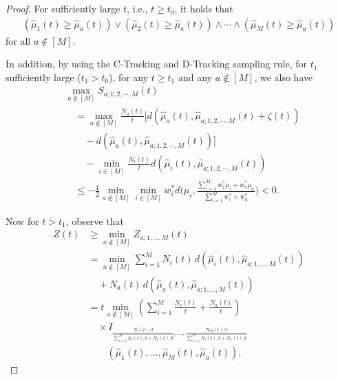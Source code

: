 \documentclass[10pt,a4paper]{amsart}
\newcommand{\nn}{\nonumber}
\begin{document}
\begin{proof}
For sufficiently large $ t$, i.e., $t \geq t_0$, it holds that
\begin{align}
(\hat{\mu}_1(t) \geq \hat{\mu}_a(t)) \vee (\hat{\mu}_2(t) \geq \hat{\mu}_a(t)) \wedge \cdots \wedge (\hat{\mu}_M(t) \geq \hat{\mu}_a(t))
\end{align}
for all $ a \notin [M]$.

In addition, by using the C-Tracking and D-Tracking sampling rule, for $t_1$ sufficiently large ($t_1>t_0$), for any $t\geq t_1$ and any $a \notin [M]$, we also have
\begin{align}
&\max_{a \notin [M]} S_{a;1,2,\cdots,M}(t) \nn \\
&\quad =\max_{a \notin [M]} \frac{N_a(t)}{t} \big[d(\hat{\mu}_a(t),\hat{\mu}_{a;1,2,\cdots,M}(t)+\zeta(t))\nn\\
&\qquad - d(\hat{\mu}_a(t),\hat{\mu}_{a;1,2,\cdots,M}(t))\big]\nn\\
&\qquad -\min_{i \in [M]} \frac{N_i(t)}{t} d(\hat{\mu}_i(t),\hat{\mu}_{a;1,2,\cdots,M}(t)) \nn \\
&\quad  \leq -\frac{1}{2}\min_{a \notin [M]} \min_{i \in [M]}  w_i^* d\bigg(\mu_i, \frac{\sum_{i=1}^M w_i^* \mu_i +w_a^* \mu_a}{\sum_{i=1}^M w_i^*+ w_a^*}\bigg)<0. 
\end{align}

Now for $t>t_1$, observe that
\begin{align}
Z(t) &\geq \min_{a \notin [M]} Z_{a;1,\ldots,M}(t) \nn \\
&= \min_{a \notin [M]} \sum_{i=1}^M N_i(t)\, d\left(\hat{\mu}_i(t), \hat{\mu}_{a;1,\ldots,M}(t)\right) \nn\\
&\quad + N_a(t)\, d\left(\hat{\mu}_a(t), \hat{\mu}_{a;1,\ldots,M}(t)\right) \nn \\
&= t  \min_{a \notin [M]} \left( \sum_{i=1}^M \frac{N_i(t)}{t} + \frac{N_a(t)}{t} \right) \nn \\
&\quad \times  I_{\frac{N_1(t)/t}{\sum_{i=1}^M N_i(t)/t + N_a(t)/t}, \ldots, \frac{N_M(t)/t}{\sum_{i=1}^M N_i(t)/t + N_a(t)/t}} \nn\\
&\qquad \left( \hat{\mu}_1(t), \ldots, \hat{\mu}_M(t), \hat{\mu}_a(t) \right).
\end{align}


\end{proof}
\end{document}
